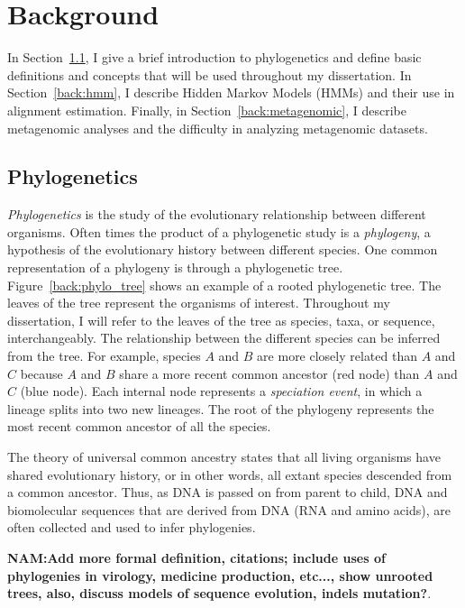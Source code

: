 \chapter{Background}
\label{background}%
In Section~\ref{back:phylogenetics}, I give a brief introduction to phylogenetics and define basic definitions and concepts that will be used throughout my dissertation.  In Section~\ref{back:hmm}, I describe Hidden Markov Models (HMMs) and their use in alignment estimation. Finally, in Section~\ref{back:metagenomic}, I describe metagenomic analyses and the difficulty in analyzing metagenomic datasets.

\section{Phylogenetics}\label{back:phylogenetics}
\emph{Phylogenetics} is the study of the evolutionary relationship between different organisms.  Often times the product of a phylogenetic study is a \emph{phylogeny}, a hypothesis of the evolutionary history between different species.  One common representation of a phylogeny is through a phylogenetic tree.  Figure~\ref{back:phylo_tree} shows an example of a rooted phylogenetic tree.  
The leaves of the tree represent the organisms of interest.  Throughout my dissertation, I will refer to the leaves of the tree as species, taxa, or sequence, interchangeably.  The relationship between the different species can be inferred from the tree.  For example, species $A$ and $B$ are more closely related than $A$ and $C$ because $A$ and $B$ share a more recent common ancestor (red node) than $A$ and $C$ (blue node).  Each internal node represents a \emph{speciation event}, in which a lineage splits into two new lineages.  The root of the phylogeny represents the most recent common ancestor of all the species.  

The theory of universal common ancestry states that all living organisms have shared evolutionary history, or in other words, all extant species descended from a common ancestor.  Thus, as DNA is passed on from parent to child, DNA and biomolecular sequences that are derived from DNA (RNA and amino acids), are often collected and used to infer phylogenies.  

\textbf{NAM:Add more formal definition, citations; include uses of phylogenies in virology, medicine production, etc..., show unrooted trees, also, discuss models of sequence evolution, indels mutation?}.

